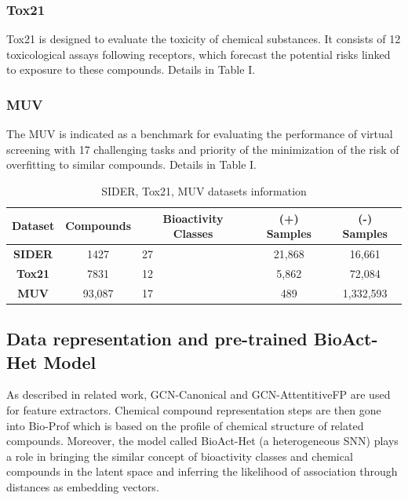 \documentclass[conference]{IEEEtran}
\begin{document}
\subsubsection{Tox21}
Tox21 is designed to evaluate the toxicity of chemical substances. It consists of 12 toxicological assays following receptors, which forecast the potential risks linked to exposure to these compounds. Details in Table I.\\

\subsubsection{MUV}
The MUV is indicated as a benchmark for evaluating the performance of virtual screening with 17 challenging tasks and priority of the minimization of the risk of overfitting to similar compounds. Details in Table I.

\begin{table}[h!]
  \centering
  \caption{SIDER, Tox21, MUV datasets information}
  \label{tab: SIDER, Tox21, MUV Datasets}
  \begin{tabular}{|c|c|m{1.3cm}|c|c|}
    \hline
    \rowcolor{headercolor}
    \textbf{Dataset} & \textbf{Compounds} & \multicolumn{1}{|c|}{\textbf{Bioactivity Classes}} & \textbf{(+) Samples} & \textbf{(-) Samples} \\ \hline
    \textbf{SIDER}   & 1427               & 27                                                 & 21,868               & 16,661               \\ \hline
    \textbf{Tox21}   & 7831               & 12                                                 & 5,862                & 72,084               \\ \hline
    \textbf{MUV}     & 93,087             & 17                                                 & 489                  & 1,332,593            \\ \hline
  \end{tabular}
\end{table}

\subsection{Data representation and pre-trained BioAct-Het Model}
As described in related work, GCN-Canonical and GCN-AttentitiveFP are used for feature extractors. Chemical compound representation steps are then gone into Bio-Prof which is based on the profile of chemical structure of related compounds. Moreover, the model called BioAct-Het (a heterogeneous SNN) plays a role in bringing the similar concept of bioactivity classes and chemical compounds in the latent space and inferring the likelihood of association through distances as embedding vectors. \\
\end{document}
